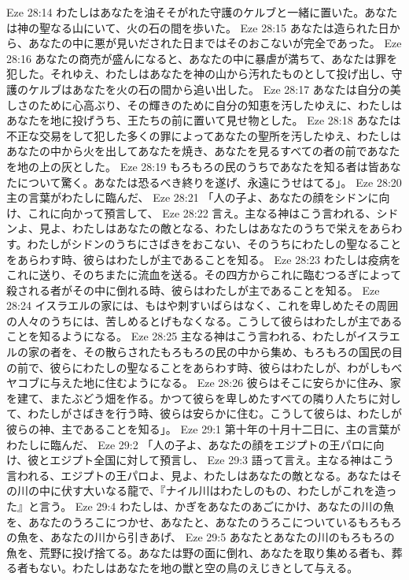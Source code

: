 Eze 28:14  わたしはあなたを油そそがれた守護のケルブと一緒に置いた。あなたは神の聖なる山にいて、火の石の間を歩いた。
Eze 28:15  あなたは造られた日から、あなたの中に悪が見いだされた日まではそのおこないが完全であった。
Eze 28:16  あなたの商売が盛んになると、あなたの中に暴虐が満ちて、あなたは罪を犯した。それゆえ、わたしはあなたを神の山から汚れたものとして投げ出し、守護のケルブはあなたを火の石の間から追い出した。
Eze 28:17  あなたは自分の美しさのために心高ぶり、その輝きのために自分の知恵を汚したゆえに、わたしはあなたを地に投げうち、王たちの前に置いて見せ物とした。
Eze 28:18  あなたは不正な交易をして犯した多くの罪によってあなたの聖所を汚したゆえ、わたしはあなたの中から火を出してあなたを焼き、あなたを見るすべての者の前であなたを地の上の灰とした。
Eze 28:19  もろもろの民のうちであなたを知る者は皆あなたについて驚く。あなたは恐るべき終りを遂げ、永遠にうせはてる」。
Eze 28:20  主の言葉がわたしに臨んだ、
Eze 28:21  「人の子よ、あなたの顔をシドンに向け、これに向かって預言して、
Eze 28:22  言え。主なる神はこう言われる、シドンよ、見よ、わたしはあなたの敵となる、わたしはあなたのうちで栄えをあらわす。わたしがシドンのうちにさばきをおこない、そのうちにわたしの聖なることをあらわす時、彼らはわたしが主であることを知る。
Eze 28:23  わたしは疫病をこれに送り、そのちまたに流血を送る。その四方からこれに臨むつるぎによって殺される者がその中に倒れる時、彼らはわたしが主であることを知る。
Eze 28:24  イスラエルの家には、もはや刺すいばらはなく、これを卑しめたその周囲の人々のうちには、苦しめるとげもなくなる。こうして彼らはわたしが主であることを知るようになる。
Eze 28:25  主なる神はこう言われる、わたしがイスラエルの家の者を、その散らされたもろもろの民の中から集め、もろもろの国民の目の前で、彼らにわたしの聖なることをあらわす時、彼らはわたしが、わがしもべヤコブに与えた地に住むようになる。
Eze 28:26  彼らはそこに安らかに住み、家を建て、またぶどう畑を作る。かつて彼らを卑しめたすべての隣り人たちに対して、わたしがさばきを行う時、彼らは安らかに住む。こうして彼らは、わたしが彼らの神、主であることを知る」。
Eze 29:1  第十年の十月十二日に、主の言葉がわたしに臨んだ、
Eze 29:2  「人の子よ、あなたの顔をエジプトの王パロに向け、彼とエジプト全国に対して預言し、
Eze 29:3  語って言え。主なる神はこう言われる、エジプトの王パロよ、見よ、わたしはあなたの敵となる。あなたはその川の中に伏す大いなる龍で、『ナイル川はわたしのもの、わたしがこれを造った』と言う。
Eze 29:4  わたしは、かぎをあなたのあごにかけ、あなたの川の魚を、あなたのうろこにつかせ、あなたと、あなたのうろこについているもろもろの魚を、あなたの川から引きあげ、
Eze 29:5  あなたとあなたの川のもろもろの魚を、荒野に投げ捨てる。あなたは野の面に倒れ、あなたを取り集める者も、葬る者もない。わたしはあなたを地の獣と空の鳥のえじきとして与える。
